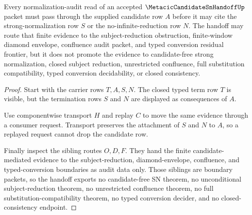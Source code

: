 \begin{theorem}
\label{thm:metacic-candidate-sn-handoff-nonescape}
Every normalization-audit read of an accepted $\MetacicCandidateSnHandoffUp$ packet must pass through the supplied candidate row $A$ before it may cite the strong-normalization row $S$ or the no-infinite-reduction row $N$. The handoff may route that finite evidence to the subject-reduction obstruction, finite-window diamond envelope, confluence audit packet, and typed conversion residual frontier, but it does not promote the evidence to candidate-free strong normalization, closed subject reduction, unrestricted confluence, full substitution compatibility, typed conversion decidability, or closed consistency.
\end{theorem}
\begin{proof}
Start with the carrier rows $T,A,S,N$. The closed typed term row $T$ is visible, but the termination rows $S$ and $N$ are displayed as consequences of $A$.

Use componentwise transport $H$ and replay $C$ to move the same evidence through a consumer request. Transport preserves the attachment of $S$ and $N$ to $A$, so a replayed request cannot drop the candidate row.

Finally inspect the sibling routes $O,D,F$. They hand the finite candidate-mediated evidence to the subject-reduction, diamond-envelope, confluence, and typed-conversion boundaries as audit data only. Those siblings are boundary packets, so the handoff exports no candidate-free SN theorem, no unconditional subject-reduction theorem, no unrestricted confluence theorem, no full substitution-compatibility theorem, no typed conversion decider, and no closed-consistency endpoint.
\end{proof}


